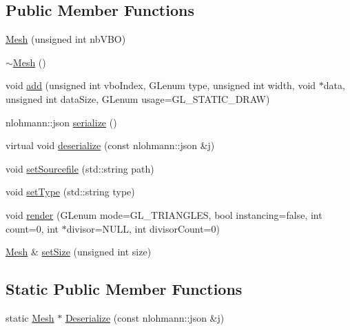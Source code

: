 \subsection*{Public Member Functions}
\begin{DoxyCompactItemize}
\item 
\mbox{\hyperlink{class_beer_engine_1_1_graphics_1_1_mesh_ae159a28de064d54eb46449409fc9fe4c}{Mesh}} (unsigned int nb\+V\+BO)
\item 
\mbox{\hyperlink{class_beer_engine_1_1_graphics_1_1_mesh_a431d1ff7416183e410ffd9b7de1bace3}{$\sim$\+Mesh}} ()
\item 
void \mbox{\hyperlink{class_beer_engine_1_1_graphics_1_1_mesh_a72b23ade4bb8777ff85c36c0e0920725}{add}} (unsigned int vbo\+Index, G\+Lenum type, unsigned int width, void $\ast$data, unsigned int data\+Size, G\+Lenum usage=G\+L\+\_\+\+S\+T\+A\+T\+I\+C\+\_\+\+D\+R\+AW)
\item 
nlohmann\+::json \mbox{\hyperlink{class_beer_engine_1_1_graphics_1_1_mesh_a2bdd2912e84c9e2d686bdad2dbf6ec9e}{serialize}} ()
\item 
virtual void \mbox{\hyperlink{class_beer_engine_1_1_graphics_1_1_mesh_a888ed58ac7ecc446be640f7fe5f546ee}{deserialize}} (const nlohmann\+::json \&j)
\item 
void \mbox{\hyperlink{class_beer_engine_1_1_graphics_1_1_mesh_a9c0d91380cd84b6850e850ed9b4d61ed}{set\+Sourcefile}} (std\+::string path)
\item 
void \mbox{\hyperlink{class_beer_engine_1_1_graphics_1_1_mesh_a296b58a337dab85843a69f1dced68125}{set\+Type}} (std\+::string type)
\item 
void \mbox{\hyperlink{class_beer_engine_1_1_graphics_1_1_mesh_a450ceb1ed5555ad5f57f29700a1d5311}{render}} (G\+Lenum mode=G\+L\+\_\+\+T\+R\+I\+A\+N\+G\+L\+ES, bool instancing=false, int count=0, int $\ast$divisor=N\+U\+LL, int divisor\+Count=0)
\item 
\mbox{\hyperlink{class_beer_engine_1_1_graphics_1_1_mesh}{Mesh}} \& \mbox{\hyperlink{class_beer_engine_1_1_graphics_1_1_mesh_ad149bbda494d7043fe49de9571534f03}{set\+Size}} (unsigned int size)
\end{DoxyCompactItemize}
\subsection*{Static Public Member Functions}
\begin{DoxyCompactItemize}
\item 
static \mbox{\hyperlink{class_beer_engine_1_1_graphics_1_1_mesh}{Mesh}} $\ast$ \mbox{\hyperlink{class_beer_engine_1_1_graphics_1_1_mesh_af7f37a0b7df0a483a837d1b59faa96b8}{Deserialize}} (const nlohmann\+::json \&j)
\end{DoxyCompactItemize}


